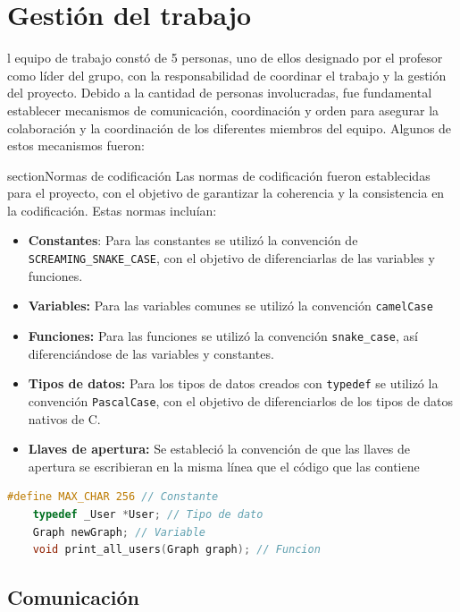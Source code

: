 \documentclass[9pt,letterpaper,onecolumn]{rho-class/rho}
\begin{document}
\newpage
\section{Gestión del trabajo}
l equipo de trabajo constó de 5 personas, uno de ellos designado por el profesor como líder del grupo, con la responsabilidad de coordinar el trabajo y la gestión del proyecto. Debido a la cantidad de personas involucradas, fue fundamental establecer mecanismos de comunicación, coordinación y orden para asegurar la colaboración y la coordinación de los diferentes miembros del equipo. Algunos de estos mecanismos fueron:

section{Normas de codificación}
Las normas de codificación fueron establecidas para el proyecto, con el objetivo de garantizar la coherencia y la consistencia en la codificación. Estas normas incluían:

\begin{itemize}
	\item \textbf{Constantes}: Para las constantes se utilizó la convención de \texttt{SCREAMING\_SNAKE\_CASE}, con el objetivo de diferenciarlas de las variables y funciones.
	\item \textbf{Variables:} Para las variables comunes se utilizó la convención \texttt{camelCase}
	\item \textbf{Funciones:} Para las funciones se utilizó la convención \texttt{snake\_case}, así diferenciándose de las variables y constantes.
	\item \textbf{Tipos de datos:} Para los tipos de datos creados con \texttt{typedef} se utilizó la convención \texttt{PascalCase}, con el objetivo de diferenciarlos de los tipos de datos nativos de C.
	\item \textbf{Llaves de apertura:} Se estableció la convención de que las llaves de apertura se escribieran en la misma línea que el código que las contiene
\end{itemize}

\begin{lstlisting}[caption={Ejemplo de código, utilizando las normas de codificación}, label={lst:normas_codificacion}, language=C]
	#define MAX_CHAR 256 // Constante
	typedef _User *User; // Tipo de dato
	Graph newGraph; // Variable
	void print_all_users(Graph graph); // Funcion
\end{lstlisting}

\subsection{Comunicación}
\end{document}
